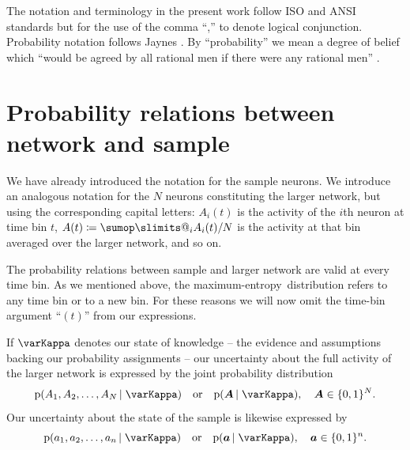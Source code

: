 \documentclass[\ifafour a4paper,12pt,\else a5paper,10pt,\fi%
onecolumn,oneside,article,%
british%
]{memoir}
\makeatletter
\theoremstyle{remark}
\theoremstyle{innote}
\def\sum{\DOTSI\sumop\slimits@}
\newcommand*{\citep}{\parencites}
\newcommand*{\defd}{\coloneqq}
\DeclarePairedDelimiter\set{\{}{\}}
\newcommand*{\pf}{\mathrm{p}}%
\renewcommand*{\|}{\nonscript\,\vert\nonscript\;\mathopen{}}
\newcommand*{\yAv}{A}
\newcommand*{\yav}{a}
\newcommand*{\yNv}{N}
\newcommand*{\yaa}{\bm{\yav}}%
\newcommand*{\yAA}{\bm{\yAv}}%
\newcommand*{\yA}{\yAv}%
\newcommand*{\yHc}{\varKappa}
\newcommand*{\me}{maximum-entropy}
\makeatother
\begin{document}
The notation and terminology in the present work follow ISO and ANSI standards
\citep{iso1993,ieee1993,nist1995,iso2006,iso2006b} but for the use of the
comma \enquote{,} to denote logical conjunction. Probability notation
follows Jaynes \citep{jaynes1994_r2003}. By \enquote{probability} we mean a
degree of belief which \enquote{would be agreed by all rational men if
  there were any rational men} \citep{good1966}.



\section{Probability relations between network and  sample}
\label{sec:prob_samples}

We have already introduced the notation for the sample neurons. We
introduce an analogous notation for the $\yNv$ neurons constituting the
larger network, but using the corresponding capital letters:
$\yAv_{i}(t)$ is the activity of the $i$th neuron at time bin $t$,
$\yA(t) \defd \sum_{i} \yAv_{i}(t)/\yNv$ is the activity at that
bin averaged over the larger network, and so on.

The probability relations between sample and larger network are valid at
every time bin. As we mentioned above, the \me\ distribution refers to any
time bin or to a new bin. For these reasons we will now omit the time-bin
argument \enquote{$(t)$} from our expressions. 



If $\yHc$ denotes our state of knowledge -- the evidence and assumptions
backing our probability assignments -- our uncertainty about the full
activity of the larger network is expressed by the joint probability
distribution
\begin{equation}
  \label{eq:joint_plaus}
  \pf(\yAv_1, \yAv_2, \dotsc, \yAv_\yNv \| \yHc)
  \quad\text{or}\quad
\pf(\yAA \| \yHc), \quad \yAA \in \set{0,1}^\yNv.
\end{equation}
Our uncertainty about the state of the sample is likewise expressed by
\begin{equation}
  \label{eq:sample_plaus}
  \pf(\yav_1, \yav_2, \dotsc, \yav_n \| \yHc) \quad\text{or}\quad
\pf(\yaa \| \yHc), \quad \yaa \in \set{0,1}^n.
\end{equation}
\end{document}
